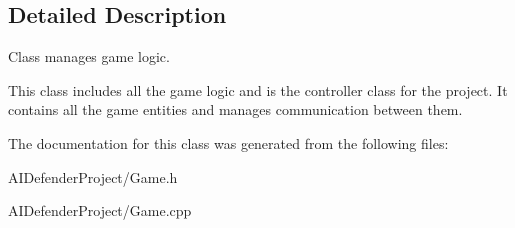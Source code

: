 \subsection{Detailed Description}
Class manages game logic. 

This class includes all the game logic and is the controller class for the project. It contains all the game entities and manages communication between them. 

The documentation for this class was generated from the following files\+:\begin{DoxyCompactItemize}
\item 
A\+I\+Defender\+Project/Game.\+h\item 
A\+I\+Defender\+Project/Game.\+cpp\end{DoxyCompactItemize}
